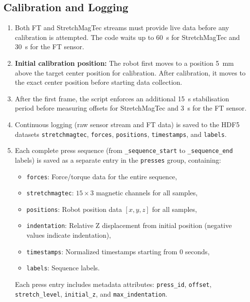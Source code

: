 \documentclass[11pt,a4paper]{article}
\begin{document}
\subsection{Calibration and Logging}
\begin{enumerate}[leftmargin=1.5em]
    \item Both FT and StretchMagTec streams must provide live data before any calibration is
          attempted. The code waits up to \SI{60}{\second} for StretchMagTec and \SI{30}{\second}
          for the FT sensor.
    \item \textbf{Initial calibration position:} The robot first moves to a position \SI{5}{\milli\metre} above the target center position for calibration. After calibration, it moves to the exact center position before starting data collection.
    \item After the first frame, the script enforces an additional \SI{15}{\second}
          stabilisation period before measuring offsets for StretchMagTec and \SI{3}{\second}
          for the FT sensor.
    \item Continuous logging (raw sensor stream and FT data) is saved to the HDF5 datasets
          \texttt{stretchmagtec}, \texttt{forces}, \texttt{positions}, \texttt{timestamps},
          and \texttt{labels}.
    \item Each complete press sequence (from \texttt{\_sequence\_start} to \texttt{\_sequence\_end} labels)
          is saved as a separate entry in the \texttt{presses} group, containing:
          \begin{itemize}
              \item \texttt{forces}: Force/torque data for the entire sequence,
              \item \texttt{stretchmagtec}: \(15 \times 3\) magnetic channels for all samples,
              \item \texttt{positions}: Robot position data \([x, y, z]\) for all samples,
              \item \texttt{indentation}: Relative Z displacement from initial position (negative values indicate indentation),
              \item \texttt{timestamps}: Normalized timestamps starting from 0 seconds,
              \item \texttt{labels}: Sequence labels.
          \end{itemize}
          Each press entry includes metadata attributes: \texttt{press\_id}, \texttt{offset}, \texttt{stretch\_level},
          \texttt{initial\_z}, and \texttt{max\_indentation}.

\end{enumerate}
\end{document}
